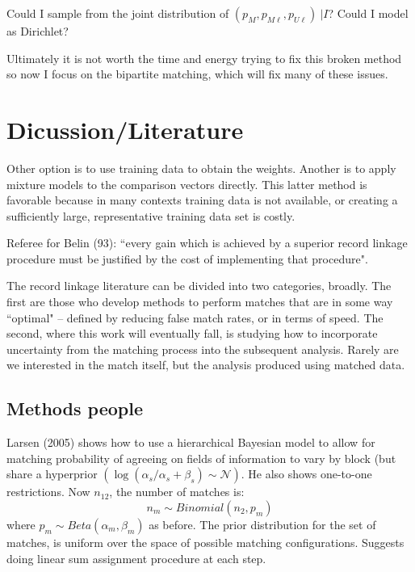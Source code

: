 \documentclass[11pt,reqno]{amsart}
\begin{document}
Could I sample from the joint distribution of $(p_M, p_{M\ell}, p_{U\ell})\ | I$?  Could I model as Dirichlet?

Ultimately it is not worth the time and energy trying to fix this broken method so now I focus on the bipartite matching, which will fix many of these issues.


\section{Dicussion/Literature}

Other option is to use training data to obtain the weights.  Another is to apply mixture models to the comparison vectors directly.  This latter method is favorable because in many contexts training data is not available, or creating a sufficiently large, representative training data set is costly.  

Referee for Belin (93): ``every gain which is achieved by a superior record linkage procedure must be justified by the cost of implementing that procedure". 


The record linkage literature can be divided into two categories, broadly.  The first are those who develop methods to perform matches that are in some way ``optimal" -- defined by reducing false match rates, or in terms of speed.  The second, where this work will eventually fall, is studying how to incorporate uncertainty from the matching process into the subsequent analysis.  Rarely are we interested in the match itself, but the analysis produced using matched data.  
\subsection{Methods people}
Larsen (2005) shows how to use a hierarchical Bayesian model to allow for matching probability of agreeing on fields of information to vary by block (but share a hyperprior $(\log(\alpha_s/\alpha_s+\beta_s) \sim \mathcal{N})$.  He also shows one-to-one restrictions.  Now $n_{12}$, the number of matches is:
\[ n_{m} \sim Binomial(n_2, p_m) \] 
where $p_m \sim Beta(\alpha_m, \beta_m)$ as before. The prior distribution for the set of matches, is uniform over the space of possible matching configurations. Suggests doing linear sum assignment procedure at each step.  %
\end{document}
